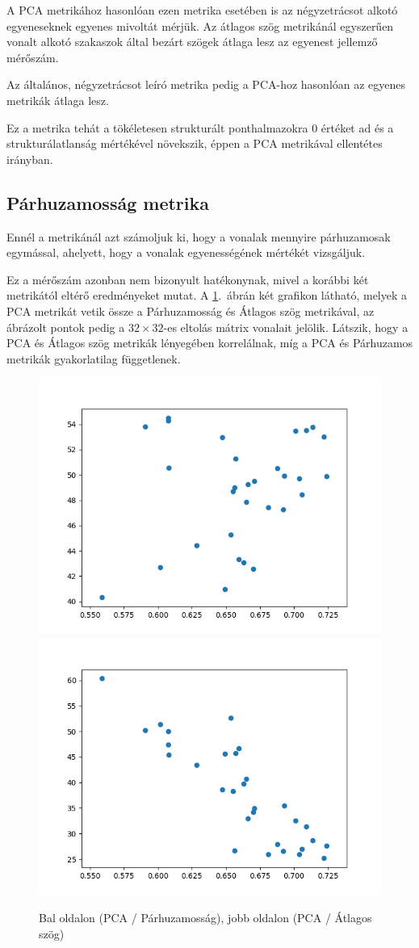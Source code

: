 A PCA metrikához hasonlóan ezen metrika esetében is az négyzetrácsot alkotó egyeneseknek egyenes mivoltát mérjük. Az átlagos szög metrikánál egyszerűen vonalt alkotó szakaszok által bezárt szögek átlaga lesz az egyenest jellemző mérőszám. 

Az általános, négyzetrácsot leíró metrika pedig a PCA-hoz hasonlóan az egyenes metrikák átlaga lesz.

Ez a metrika tehát a tökéletesen strukturált ponthalmazokra $0$ értéket ad és a strukturálatlanság mértékével növekszik, éppen a PCA metrikával ellentétes irányban.

\subsection{Párhuzamosság metrika}

Ennél a metrikánál azt számoljuk ki, hogy a vonalak mennyire párhuzamosak egymással, ahelyett, hogy a vonalak egyenességének mértékét vizsgáljuk. 

Ez a mérőszám azonban nem bizonyult hatékonynak, mivel a korábbi két metrikától eltérő eredményeket mutat. A \ref{para2}.~ábrán két grafikon látható, melyek a PCA metrikát vetik össze a Párhuzamosság és Átlagos szög metrikával, az ábrázolt pontok pedig a $32\times32$-es eltolás mátrix vonalait jelölik. Látszik, hogy a PCA és Átlagos szög metrikák lényegében korrelálnak, míg a PCA és Párhuzamos metrikák gyakorlatilag függetlenek.

\begin{figure}[h!]
	\begin{center}
	\includegraphics[width=0.45\linewidth]{evr-vs-parallelness-ldim10.png}
		\includegraphics[width=0.45\linewidth]{evr-vs-straightness-ldim10.png}
	\end{center}
  \caption{Bal oldalon (PCA / Párhuzamosság), jobb oldalon (PCA / Átlagos szög)}\label{para2}
\end{figure}

